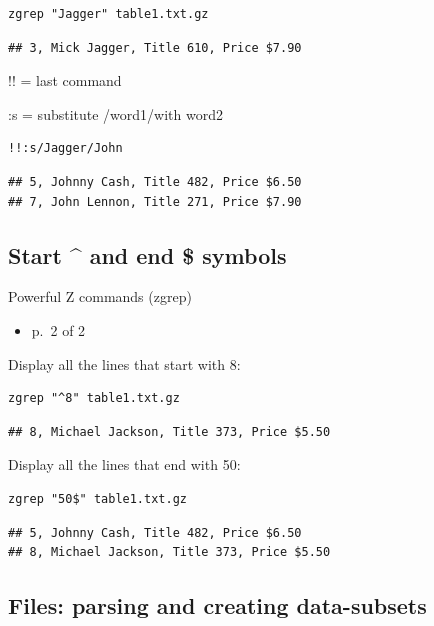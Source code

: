 \documentclass[
]{book}
\providecommand{\tightlist}{%
  \setlength{\itemsep}{0pt}\setlength{\parskip}{0pt}}
\begin{document}
\begin{verbatim}
zgrep "Jagger" table1.txt.gz
\end{verbatim}

\begin{verbatim}
## 3, Mick Jagger, Title 610, Price $7.90
\end{verbatim}

!! = last command

:s = substitute /word1/with word2

\begin{verbatim}
!!:s/Jagger/John
\end{verbatim}

\begin{verbatim}
## 5, Johnny Cash, Title 482, Price $6.50
## 7, John Lennon, Title 271, Price $7.90
\end{verbatim}

\hypertarget{start-and-end-symbols}{%
\subsection{Start \^{} and end \$ symbols}\label{start-and-end-symbols}}

Powerful Z commands (zgrep)

\begin{itemize}
\tightlist
\item
  p.~2 of 2
\end{itemize}

Display all the lines that start with 8:

\begin{verbatim}
zgrep "^8" table1.txt.gz
\end{verbatim}

\begin{verbatim}
## 8, Michael Jackson, Title 373, Price $5.50
\end{verbatim}

Display all the lines that end with 50:

\begin{verbatim}
zgrep "50$" table1.txt.gz
\end{verbatim}

\begin{verbatim}
## 5, Johnny Cash, Title 482, Price $6.50
## 8, Michael Jackson, Title 373, Price $5.50
\end{verbatim}

\hypertarget{files-parsing-and-creating-data-subsets}{%
\subsection{Files: parsing and creating data-subsets}\label{files-parsing-and-creating-data-subsets}}
\end{document}
